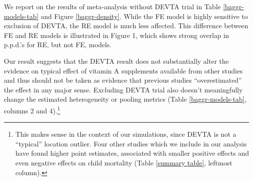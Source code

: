 \documentclass[12pt]{article}
\begin{document}
We report on the results of meta-analysis without DEVTA trial in Table \ref{baggr-models-tab} and Figure \ref{baggr-density}. While the FE model is highly sensitive to exclusion of DEVTA, the RE model is much less affected. This difference between FE and RE models is illustrated in Figure 1, which shows strong overlap in p.p.d.'s for RE, but not FE, models.

Our result suggests that the DEVTA result does not substantially alter the evidence on typical effect of vitamin A supplements available from other studies and thus should not be taken as evidence that previous studies ``overestimated'' the effect in any major sense. Excluding DEVTA trial also doesn't meaningfully change the estimated heterogeneity or pooling metrics (Table \ref{baggr-models-tab}, columns 2 and 4).\footnote{This makes sense in the context of our simulations, since DEVTA is not a ``typical'' location outlier. Four other studies which we include in our analysis have found higher point estimates, associated with smaller positive effects and even negative effects on child mortality (Table \ref{summary table}, leftmost column).}



\end{document}

